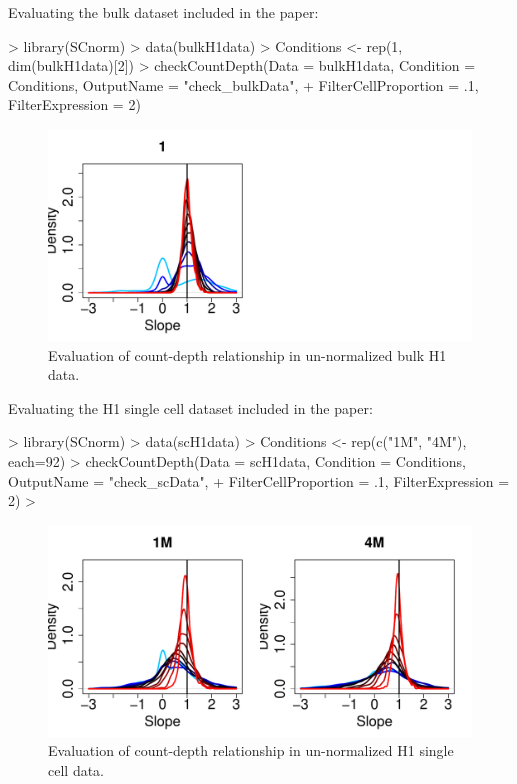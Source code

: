 \documentclass{article}
\begin{document}
Evaluating the bulk dataset included in the paper:
\begin{Schunk}
\begin{Sinput}
> library(SCnorm)
> data(bulkH1data)
> Conditions <- rep(1, dim(bulkH1data)[2])
> checkCountDepth(Data = bulkH1data, Condition = Conditions, OutputName = "check_bulkData", 
+                 FilterCellProportion = .1, FilterExpression = 2)
\end{Sinput}
\end{Schunk}

\begin{figure}[h!]
\centering
\includegraphics[width=.7\textwidth]{check_bulkData_initial_evaluation}
\caption{Evaluation of count-depth relationship in un-normalized bulk H1 data.}
\end{figure}

Evaluating the H1 single cell dataset included in the paper:
\begin{Schunk}
\begin{Sinput}
> library(SCnorm)
> data(scH1data)
> Conditions <- rep(c("1M", "4M"), each=92)
> checkCountDepth(Data = scH1data, Condition = Conditions, OutputName = "check_scData", 
+                 FilterCellProportion = .1, FilterExpression = 2)
> 
\end{Sinput}
\end{Schunk}

\begin{figure}[h!]
\centering
\includegraphics[width=.7\textwidth]{check_scData_initial_evaluation}
\caption{Evaluation of count-depth relationship in un-normalized H1 single cell data.}
\end{figure}
\end{document}
